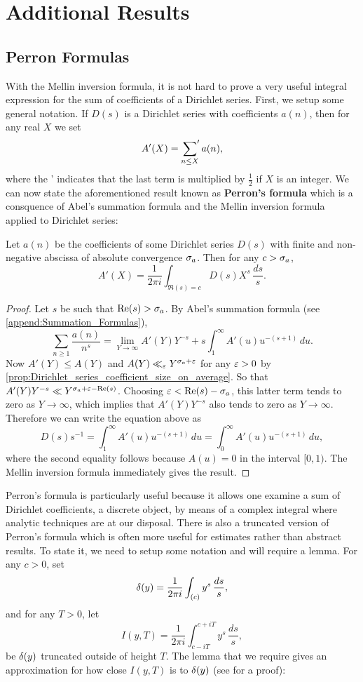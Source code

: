   \chapter{Additional Results}
    \section{Perron Formulas}
      With the Mellin inversion formula, it is not hard to prove a very useful integral expression for the sum of coefficients of a Dirichlet series. First, we setup some general notation. If $D(s)$ is a Dirichlet series with coefficients $a(n)$, then for any real $X$ we set
      \[
        A'(X) = \sideset{}{'}\sum_{n \le X}a(n),
      \]
      where the ' indicates that the last term is multiplied by $\frac{1}{2}$ if $X$ is an integer. We can now state the aforementioned result known as \textbf{Perron's formula} which is a consquence of Abel's summation formula and the Mellin inversion formula applied to Dirichlet series:

      \begin{theorem}
        Let $a(n)$ be the coefficients of some Dirichlet series $D(s)$ with finite and non-negative abscissa of absolute convergence $\sigma_{a}$. Then for any $c > \sigma_{a}$,
        \[
          A'(X) = \frac{1}{2\pi i}\int_{\Re(s) = c}D(s)X^{s}\,\frac{ds}{s}.
        \]
      \end{theorem}
      \begin{proof}
        Let $s$ be such that $\mathrm{Re}(s) > \sigma_{a}$. By Abel's summation formula (see \cref{append:Summation_Formulas}),
        \[
          \sum_{n \ge 1}\frac{a(n)}{n^{s}} = \lim_{Y \to \infty}A'(Y)Y^{-s}+s\int_{1}^{\infty}A'(u)u^{-(s+1)}\,du.
        \]
        Now $A'(Y) \le A(Y)$ and $A(Y) \ll_{\varepsilon} Y^{\sigma_{a}+\varepsilon}$ for any $\varepsilon > 0$ by \cref{prop:Dirichlet_series_coefficient_size_on_average}. So that $A'(Y)Y^{-s} \ll Y^{\sigma_{a}+\varepsilon-\mathrm{Re}(s)}$. Choosing $\varepsilon < \mathrm{Re}(s)-\sigma_{a}$, this latter term tends to zero as $Y \to \infty$, which implies that $A'(Y)Y^{-s}$ also tends to zero as $Y \to \infty$. Therefore we can write the equation above as
        \[
          D(s)s^{-1} = \int_{1}^{\infty}A'(u)u^{-(s+1)}\,du = \int_{0}^{\infty}A'(u)u^{-(s+1)}\,du,
        \]
        where the second equality follows because $A(u) = 0$ in the interval $[0,1)$. The Mellin inversion formula immediately gives the result.
      \end{proof}

      Perron's formula is particularly useful because it allows one examine a sum of Dirichlet coefficients, a discrete object, by means of a complex integral where analytic techniques are at our disposal. There is also a truncated version of Perron's formula which is often more useful for estimates rather than abstract results. To state it, we need to setup some notation and will require a lemma. For any $c > 0$, set
      \[
        \delta(y) = \frac{1}{2\pi i}\int_{(c)}y^{s}\,\frac{ds}{s},
      \]
      and for any $T > 0$, let
      \[
        I(y,T) = \frac{1}{2\pi i}\int_{c-iT}^{c+iT}y^{s}\,\frac{ds}{s},
      \]
      be $\delta(y)$ truncated outside of height $T$. The lemma that we require gives an approximation for how close $I(y,T)$ is to $\delta(y)$ (see \cite{davenport2013multiplicative} for a proof):

